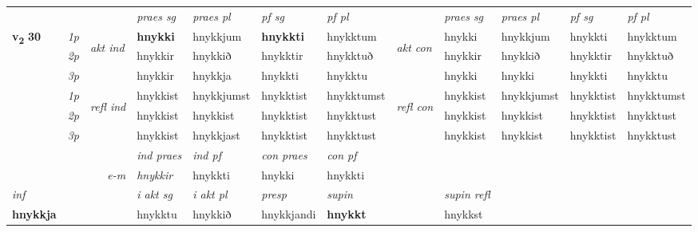 \begin{longtable}[l]{X>{\footnotesize\itshape}llXXXXlXXXX}
 & &   & \textit{praes sg}  & \textit{praes pl}    & \textit{ pf sg} & \textit{pf pl} & & \textit{praes sg}  & \textit{praes pl}    & \textit{pf sg} & \textit{pf pl }  \\ \cmidrule{4-7} \cmidrule{9-12}
 \multirow{2}{*}{{{\textbf{v{\textsubscript{2}}} \Large{\textbf{30}}}}}  & 1p & \multirow{3}{*}{\begin{turn}{90}\textit{akt ind}\end{turn}} & \textbf{hnykki} & hnykkjum & \textbf{hnykkti} & hnykktum & \multirow{3}{*}{\begin{turn}{90}\textit{akt con}\end{turn}} &hnykki & hnykkjum & hnykkti & hnykktum\\*
 & 2p &  &  hnykkir  & hnykkið & hnykktir & hnykktuð & & hnykkir & hnykkið & hnykktir & hnykktuð \\*
 & 3p &  & hnykkir & hnykkja & hnykkti & hnykktu & & hnykki & hnykki& hnykkti & hnykktu \\*
\cmidrule{4-7} \cmidrule{9-12}
 & 1p & \multirow{3}{*}{\begin{turn}{90}\textit{refl ind}\end{turn}}  & hnykkist & hnykkjumst & hnykktist & hnykktumst & \multirow{3}{*}{\begin{turn}{90}\textit{refl con}\end{turn}}  &hnykkist & hnykkjumst & hnykktist & hnykktumst \\*
 & 2p &  & hnykkist & hnykkist & hnykktist & hnykktust & &hnykkist & hnykkist & hnykktist & hnykktust \\*
 & 3p  & & hnykkist & hnykkjast & hnykktist & hnykktust & & hnykkist & hnykkist& hnykktist & hnykktust \\*
\cmidrule{4-7} \cmidrule{9-12}

   && &  \textit{ind praes} & \textit{ind pf} & \textit{con praes} & \textit{con pf} \\*
\multicolumn{3}{r}{\textit{e-m}} & hnykkir & hnykkti & hnykki & hnykkti \\*

\cmidrule{4-7}
   {\textit{inf}} & &  & \textit{i akt sg} & \textit{i akt pl}   & \textit{presp} & \textit{supin} && \textit{supin refl}  \\*
  {\textbf{hnykkja}} & && hnykktu  & hnykkið   & hnykkjandi &  \textbf{hnykkt} && hnykkst  \\*

\midrule


\end{longtable}

